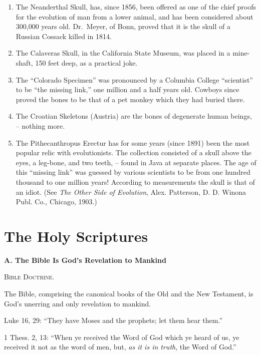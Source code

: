 \documentclass[
]{book}
\begin{document}
\begin{enumerate}
\def\labelenumi{\arabic{enumi}.}
\item
  The Neanderthal Skull, has, since 1856, been offered as one of the chief proofs for the evolution of man from a lower animal, and has been considered about 300,000 years old. Dr.~Meyer, of Bonn, proved that it is the skull of a Russian Cossack killed in 1814.
\item
  The Calaveras Skull, in the California State Museum, was placed in a mine-shaft, 150 feet deep, as a practical joke.
\item
  The ``Colorado Specimen'' was pronounced by a Columbia College ``scientist'' to be ``the missing link,'' one million and a half years old. Cowboys since proved the bones to be that of a pet monkey which they had buried there.
\item
  The Croatian Skeletons (Austria) are the bones of degenerate human beings, -- nothing more.
\item
  The Pithecanthropus Erectur has for some years (since 1891) been the most popular relic with evolutionists. The collection consisted of a skull above the eyes, a leg-bone, and two teeth, -- found in Java at separate places. The age of this ``missing link'' was guessed by various scientists to be from one hundred thousand to one million years! According to measurements the skull is that of an idiot. (See \emph{The Other Side of Evolution}, Alex. Patterson, D. D. Winona Publ. Co., Chicago, 1903.)
\end{enumerate}

\section{The Holy Scriptures}\label{the-holy-scriptures}

\begin{center}
\textbf{A.  The Bible Is God's Revelation to Mankind}

\textsc{Bible Doctrine.}
\end{center}

The Bible, comprising the canonical books of the Old and the New Testament, is God's unerring and only revelation to mankind.

Luke 16, 29: ``They have Moses and the prophets; let them hear them.''

1 Thess. 2, 13: ``When ye received the Word of God which ye heard of us, ye received it not as the word of men, but, \emph{as it is in truth}, the Word of God.''
\end{document}
